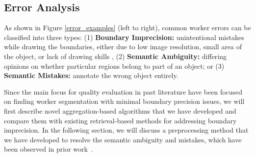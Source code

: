 \subsection{Error Analysis}
\par As shown in Figure \ref{error_examples} (left to right), common worker errors can be classified into three types: (1) \textbf{Boundary Imprecision:} unintentional mistakes while drawing the boundaries, either due to low image resolution, small area of the object, or lack of drawing skills , (2) \textbf{Semantic Ambiguity:} differing opinions on whether particular regions belong to part of an object; or (3) \textbf{Semantic Mistakes:} annotate the wrong object entirely.
\par %
Since the main focus for quality evaluation in past literature have been focused on finding worker segmentation with minimal boundary precision issues, we will first describe novel aggregation-based algorithms that we have developed and compare them with existing retrieval-based methods for addressing boundary imprecision. In the following section, we will discuss a preprocessing method that we have developed to resolve the semantic ambiguity and mistakes, which have been observed in prior work~\cite{Sorokin2008,Lin2014,Gurari2018}.